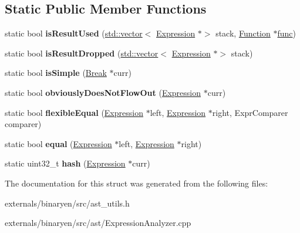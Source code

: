 \subsection*{Static Public Member Functions}
\begin{DoxyCompactItemize}
\item 
\mbox{\label{structwasm_1_1_expression_analyzer_a058d8301c936f0f3f3e8232996bb12bb}} 
static bool {\bfseries is\+Result\+Used} (\mbox{\hyperlink{classstd_1_1vector}{std\+::vector}}$<$ \mbox{\hyperlink{classwasm_1_1_expression}{Expression}} $\ast$$>$ stack, \mbox{\hyperlink{classwasm_1_1_function}{Function}} $\ast$\mbox{\hyperlink{structfunc}{func}})
\item 
\mbox{\label{structwasm_1_1_expression_analyzer_a4c21ce6aaaa71f18ae872a57225f8d7f}} 
static bool {\bfseries is\+Result\+Dropped} (\mbox{\hyperlink{classstd_1_1vector}{std\+::vector}}$<$ \mbox{\hyperlink{classwasm_1_1_expression}{Expression}} $\ast$$>$ stack)
\item 
\mbox{\label{structwasm_1_1_expression_analyzer_a6706996f19fcfaf6cdb4f7ff43b7f1f5}} 
static bool {\bfseries is\+Simple} (\mbox{\hyperlink{classwasm_1_1_break}{Break}} $\ast$curr)
\item 
\mbox{\label{structwasm_1_1_expression_analyzer_a2d25e58f1933abac814f8d3411100a25}} 
static bool {\bfseries obviously\+Does\+Not\+Flow\+Out} (\mbox{\hyperlink{classwasm_1_1_expression}{Expression}} $\ast$curr)
\item 
\mbox{\label{structwasm_1_1_expression_analyzer_ae26687ce4f6c5100f74b476b687eca4c}} 
static bool {\bfseries flexible\+Equal} (\mbox{\hyperlink{classwasm_1_1_expression}{Expression}} $\ast$left, \mbox{\hyperlink{classwasm_1_1_expression}{Expression}} $\ast$right, Expr\+Comparer comparer)
\item 
\mbox{\label{structwasm_1_1_expression_analyzer_a9723e58145a5b78edfb09e07f3d7066b}} 
static bool {\bfseries equal} (\mbox{\hyperlink{classwasm_1_1_expression}{Expression}} $\ast$left, \mbox{\hyperlink{classwasm_1_1_expression}{Expression}} $\ast$right)
\item 
\mbox{\label{structwasm_1_1_expression_analyzer_a84d4450ad077edadafd6febdefcc9592}} 
static uint32\+\_\+t {\bfseries hash} (\mbox{\hyperlink{classwasm_1_1_expression}{Expression}} $\ast$curr)
\end{DoxyCompactItemize}


The documentation for this struct was generated from the following files\+:\begin{DoxyCompactItemize}
\item 
externals/binaryen/src/ast\+\_\+utils.\+h\item 
externals/binaryen/src/ast/Expression\+Analyzer.\+cpp\end{DoxyCompactItemize}
